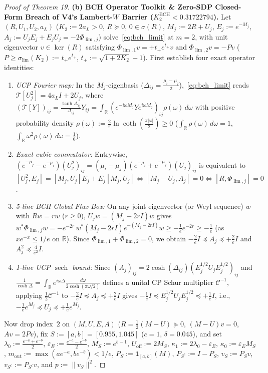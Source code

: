 \documentclass[10pt,letterpaper]{article}
\newcommand{\R}{\mathbb{R}}
\begin{document}
\begin{proof}[Proof of Theorem 19]
\textbf{(b) BCH Operator Toolkit \& Zero-SDP Closed-Form Breach of V4's Lambert-$W$ Barrier ($K_2^{\mathrm{BCH}} < 0.31722794$).}
Let $(R, U_1, U_2, a_L)$ ($K_2 := 2a_L > 0$, $R \succeq 0$, $0 \in \sigma(R)$, $M_j := 2R + U_j$, $E_j := e^{-M_j}$, $A_j := U_j E_j + E_j U_j = -2\Phi_{\lim,j}$) solve~\eqref{eq:bch_limit} at $m = 2$, with unit eigenvector $v \in \ker(R)$ satisfying $\Phi_{\lim,1} v = +t_+ e^{t_+} v$ and $\Phi_{\lim,2} v = -P v$ ($P \ge \sigma_{\lim}(K_2) := t_+ e^{t_+}$, $t_+ := \sqrt{1 + 2K_2} - 1$). First establish four exact operator identities:
\begin{enumerate}[leftmargin=1.6em,itemsep=1.5pt]
  \item \emph{UCP Fourier map:} In the $M_j$-eigenbasis ($\Delta_{ij} = \frac{\mu_i - \mu_j}{2}$),~\eqref{eq:bch_limit} reads $\mathcal{T}[U_j^2] = 4a_L I + 2 U_j$, where $(\mathcal{T}[Y])_{ij} = \frac{\tanh\Delta_{ij}}{\Delta_{ij}} Y_{ij} = \int_{\R}(e^{-i\omega M_j} Y e^{i\omega M_j})_{ij}\rho(\omega)\,d\omega$ with positive probability density $\rho(\omega) := \frac{2}{\pi}\ln\coth(\frac{\pi|\omega|}{2}) \ge 0$ ($\int_{\R}\rho(\omega)\,d\omega = 1$, $\int_{\R}\omega^2\rho(\omega)\,d\omega = \frac{1}{6}$).
  \item \emph{Exact cubic commutator:} Entrywise, $(e^{-\mu_j} - e^{-\mu_i})(U_j^2)_{ij} = (\mu_i - \mu_j)(e^{-\mu_i} + e^{-\mu_j})(U_j)_{ij}$ is equivalent to $[U_j^2, E_j] = [M_j, U_j]E_j + E_j[M_j, U_j] \iff [M_j - U_j, A_j] = 0 \iff [R, \Phi_{\lim, j}] = 0$.
  \item \emph{5-line BCH Global Flux Box:} On any joint eigenvector (or Weyl sequence) $w$ with $Rw = rw$ ($r \ge 0$), $U_j w = (M_j - 2rI)w$ gives $w^*\Phi_{\lim,j} w = -e^{-2r}\,w^*(M_j - 2rI)e^{-(M_j - 2rI)}w \ge -\frac{1}{e} e^{-2r} \ge -\frac{1}{e}$ (as $xe^{-x} \le 1/e$ on $\R$). Since $\Phi_{\lim,1} + \Phi_{\lim,2} = 0$, we obtain $-\frac{2}{e} I \preceq A_j \preceq +\frac{2}{e} I$ and $A_j^2 \preceq \frac{4}{e^2} I$.
  \item \emph{1-line UCP $\operatorname{sech}$ bound:} Since $(A_j)_{ij} = 2\cosh(\Delta_{ij})(E_j^{1/2} U_j E_j^{1/2})_{ij}$ and $\frac{1}{\cosh\Delta} = \int_{\R} e^{i\omega\Delta}\frac{d\omega}{2\cosh(\pi\omega/2)}$ defines a unital CP Schur multiplier $\mathcal{C}^{-1}$, applying $\frac{1}{2}\mathcal{C}^{-1}$ to $-\frac{2}{e}I \preceq A_j \preceq +\frac{2}{e}I$ gives $-\frac{1}{e}I \preceq E_j^{1/2} U_j E_j^{1/2} \preceq +\frac{1}{e}I$, i.e., $-\frac{1}{e} e^{M_j} \preceq U_j \preceq +\frac{1}{e} e^{M_j}$.
\end{enumerate}
Now drop index~$2$ on $(M, U, E, A)$ ($R = \frac{1}{2}(M - U) \succeq 0$, $(M - U)v = 0$, $Av = 2Pv$), fix $S := [a, b] = [0.955, 1.045]$ ($c = 1$, $\delta = 0.045$), and set $\lambda_0 := \frac{e^{-a}+e^{-b}}{2}$, $\varepsilon_E := \frac{e^{-a}-e^{-b}}{2}$, $M_S := e^{b-1}$, $U_{\mathrm{off}} := 2M_S$, $\kappa_1 := 2\lambda_0 - \varepsilon_E$, $\kappa_0 := \varepsilon_E M_S$, $m_{\mathrm{out}} := \max(ae^{-a}, be^{-b}) < 1/e$, $P_S := \mathbf{1}_{[a,b]}(M)$, $P_{S^c} := I - P_S$, $v_S := P_S v$, $v_{S^c} := P_{S^c} v$, and $p := \|v_S\|^2$.


\end{proof}
\end{document}
